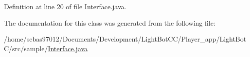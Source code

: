 Definition at line 20 of file Interface.\+java.



The documentation for this class was generated from the following file\+:\begin{DoxyCompactItemize}
\item 
/home/sebas97012/\+Documents/\+Development/\+Light\+Bot\+C\+C/\+Player\+\_\+app/\+Light\+Bot\+C/src/sample/\mbox{\hyperlink{_light_bot_c_2src_2sample_2_interface_8java}{Interface.\+java}}\end{DoxyCompactItemize}
